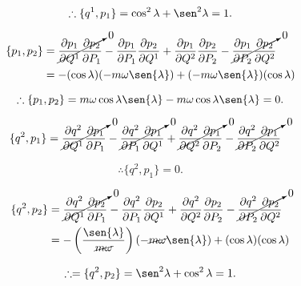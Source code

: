 \documentclass[a4paper,10pt]{article}
\numberwithin{equation}{section}
\begin{document}
\begin{equation}
 \therefore \{q^1,p_1\} = \cos^2{\lambda} + \sen^2{\lambda} = 1.
\end{equation}

\begin{align*}
  \{p_1,p_2\} &= \cancelto{0}{\frac{\partial p_1}{\partial Q^1}\frac{\partial p_2}{\partial P_1}} - 
 \frac{\partial p_1}{\partial P_1}\frac{\partial p_2}{\partial Q^1} + 
 \frac{\partial p_1}{\partial Q^2}\frac{\partial p_2}{\partial P_2} -
 \cancelto{0}{\frac{\partial p_1}{\partial P_2}\frac{\partial p_2}{\partial Q^2}} \\
 &= - (\cos{\lambda})(- m\omega\sen{\lambda}) + (- m\omega\sen{\lambda})(\cos{\lambda}) 
\end{align*}

\begin{equation}
 \therefore \{p_1,p_2\} = m\omega\cos{\lambda}\sen{\lambda} - 
 m\omega\cos{\lambda}\sen{\lambda} = 0.
\end{equation}

\begin{align*}
 \{q^2, p_1\} &= \cancelto{0}{\frac{\partial q^2}{\partial Q^1}\frac{\partial p_1}{\partial P_1}} - 
 \cancelto{0}{\frac{\partial q^2}{\partial P_1}\frac{\partial p_1}{\partial Q^1}} + 
 \cancelto{0}{\frac{\partial q^2}{\partial Q^2}\frac{\partial p_1}{\partial P_2}} -
 \cancelto{0}{\frac{\partial q^2}{\partial P_2}\frac{\partial p_1}{\partial Q^2}} 
\end{align*}

\begin{equation}
 \therefore  \{q^2, p_1\} = 0.
\end{equation}

\begin{align*}
 \{q^2, p_2\} &= \cancelto{0}{\frac{\partial q^2}{\partial Q^1}\frac{\partial p_2}{\partial P_1}} - 
 \frac{\partial q^2}{\partial P_1}\frac{\partial p_2}{\partial Q^1} + 
 \frac{\partial q^2}{\partial Q^2}\frac{\partial p_2}{\partial P_2} -
 \cancelto{0}{\frac{\partial q^2}{\partial P_2}\frac{\partial p_2}{\partial Q^2}} \\
 &= -\left(\frac{\sen{\lambda}}{\cancel{m\omega}}\right)(-\cancel{m\omega}\sen{\lambda}) + 
 (\cos{\lambda})(\cos{\lambda}) 
\end{align*}

\begin{equation}
 \therefore = \{q^2, p_2\} = \sen^2{\lambda} + \cos^2{\lambda} = 1.
\end{equation}
\end{document}
